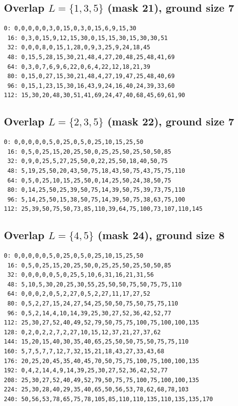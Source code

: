 \documentclass[11pt]{article}
\begin{document}
\subsection*{Overlap $L=\{1,3,5\}$ (mask 21), ground size 7}
\begin{Verbatim}[fontsize=\footnotesize]
  0: 0,0,0,0,0,3,0,15,0,3,0,15,6,9,15,30
 16: 0,3,0,15,9,12,15,30,0,15,15,30,15,30,30,51
 32: 0,0,0,8,0,15,1,28,0,9,3,25,9,24,18,45
 48: 0,15,5,28,15,30,21,48,4,27,20,48,25,48,41,69
 64: 0,3,0,7,6,9,6,22,0,6,4,22,12,18,21,39
 80: 0,15,0,27,15,30,21,48,4,27,19,47,25,48,40,69
 96: 0,15,1,23,15,30,16,43,9,24,16,40,24,39,33,60
112: 15,30,20,48,30,51,41,69,24,47,40,68,45,69,61,90
\end{Verbatim}
\subsection*{Overlap $L=\{2,3,5\}$ (mask 22), ground size 7}
\begin{Verbatim}[fontsize=\footnotesize]
  0: 0,0,0,0,0,5,0,25,0,5,0,25,10,15,25,50
 16: 0,5,0,25,15,20,25,50,0,25,25,50,25,50,50,85
 32: 0,9,0,25,5,27,25,50,0,22,25,50,18,40,50,75
 48: 5,19,25,50,20,43,50,75,18,43,50,75,43,75,75,110
 64: 0,5,0,25,10,15,25,50,0,14,25,50,24,38,50,75
 80: 0,14,25,50,25,39,50,75,14,39,50,75,39,73,75,110
 96: 5,14,25,50,15,38,50,75,14,39,50,75,38,63,75,100
112: 25,39,50,75,50,73,85,110,39,64,75,100,73,107,110,145
\end{Verbatim}
\subsection*{Overlap $L=\{4,5\}$ (mask 24), ground size 8}
\begin{Verbatim}[fontsize=\footnotesize]
  0: 0,0,0,0,0,5,0,25,0,5,0,25,10,15,25,50
 16: 0,5,0,25,15,20,25,50,0,25,25,50,25,50,50,85
 32: 0,0,0,0,0,5,0,25,5,10,6,31,16,21,31,56
 48: 5,10,5,30,20,25,30,55,25,50,50,75,50,75,75,110
 64: 0,0,0,2,0,5,2,27,0,5,2,27,11,17,27,52
 80: 0,5,2,27,15,24,27,54,25,50,50,75,50,75,75,110
 96: 0,5,2,14,4,10,14,39,25,30,27,52,36,42,52,77
112: 25,30,27,52,40,49,52,79,50,75,75,100,75,100,100,135
128: 0,2,0,2,2,7,2,27,10,15,12,37,21,27,37,62
144: 15,20,15,40,30,35,40,65,25,50,50,75,50,75,75,110
160: 5,7,5,7,7,12,7,32,15,21,18,43,27,33,43,68
176: 20,25,20,45,35,40,45,70,50,75,75,100,75,100,100,135
192: 0,4,2,14,4,9,14,39,25,30,27,52,36,42,52,77
208: 25,30,27,52,40,49,52,79,50,75,75,100,75,100,100,135
224: 25,30,28,40,29,35,40,65,50,56,53,78,62,68,78,103
240: 50,56,53,78,65,75,78,105,85,110,110,135,110,135,135,170
\end{Verbatim}
\end{document}
